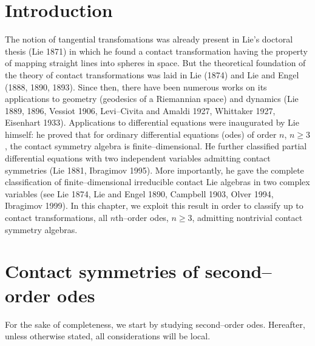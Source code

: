 \section{Introduction}
The notion of tangential transfomations was already present in Lie's doctoral
thesis (Lie 1871) in which he found a contact transformation having
the property of mapping straight lines into spheres in space. But the
theoretical foundation of the theory of contact transformations was laid in
Lie (1874) and Lie and Engel (1888, 1890, 1893). Since then, there have been
numerous works on
its applications to geometry (geodesics of a Riemannian space) and
dynamics (Lie 1889, 1896, Vessiot 1906, Levi--Civita and Amaldi 1927,
Whittaker 1927, Eisenhart 1933). Applications to differential equations were
inaugurated by Lie himself: he proved that
for ordinary differential equations (odes) of order $n$, $n \ge 3$, the
contact symmetry algebra is finite--dimensional. He further classified
partial differential equations with two independent variables admitting
contact symmetries (Lie 1881, Ibragimov 1995). More importantly, he gave
the complete classification of finite--dimensional irreducible contact
Lie algebras in two complex variables
(see Lie 1874, Lie and Engel 1890, Campbell 1903, Olver 1994, Ibragimov 1999).
In this chapter, we exploit this result
in order to  classify up to contact transformations, all $n$th--order odes,
$n \ge 3$, admitting nontrivial contact symmetry algebras.

\section{Contact symmetries of second--order odes}
For the sake of completeness, we start by studying second--order odes.
Hereafter, unless otherwise stated, all considerations will be local.


